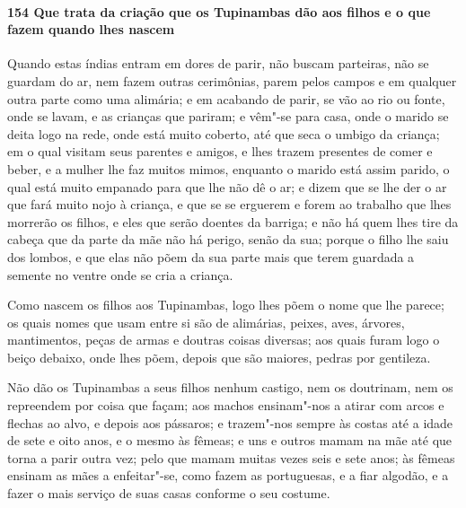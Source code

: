 \begin{linenumbers}
\paragraph{154 Que trata da criação que os Tupinambas dão aos filhos e o que fazem quando
lhes nascem}\quad
Quando estas índias entram em dores de parir, não buscam parteiras, não se guardam do ar,
nem fazem outras cerimônias, parem pelos campos e em qualquer outra parte como uma
alimária; e em acabando de parir, se vão ao rio ou fonte, onde se lavam, e as crianças que
pariram; e vêm"-se para casa, onde o marido se deita logo na rede, onde está muito coberto,
até que seca o umbigo da criança; em o qual visitam seus parentes e amigos, e lhes trazem
presentes de comer e beber, e a mulher lhe faz muitos mimos, enquanto o marido está assim
parido, o qual está muito empanado para que lhe não dê o ar; e dizem que se lhe der o ar
que fará muito nojo à criança, e que se se erguerem e forem ao trabalho que lhes morrerão
os filhos, e eles que serão doentes da barriga; e não há quem lhes tire da cabeça que da
parte da mãe não há perigo, senão da sua; porque o filho lhe saiu dos lombos, e que elas
não põem da sua parte mais que terem guardada a semente no ventre onde se cria a criança.

Como nascem os filhos aos Tupinambas, logo lhes põem o nome que lhe parece; os quais nomes
que usam entre si são de alimárias, peixes, aves, árvores, mantimentos, peças de armas e
doutras coisas diversas; aos quais furam logo o beiço debaixo, onde lhes põem, depois que
são maiores, pedras por gentileza.

Não dão os Tupinambas a seus filhos nenhum castigo, nem os doutrinam, nem os repreendem
por coisa que façam; aos machos ensinam"-nos a atirar com arcos e flechas ao alvo, e depois
aos pássaros; e trazem"-nos sempre às costas até a idade de sete e oito anos, e o mesmo às
fêmeas; e uns e outros mamam na mãe até que torna a parir outra vez; pelo que mamam muitas
vezes seis e sete anos; às fêmeas ensinam as mães a enfeitar"-se, como fazem as
portuguesas, e a fiar algodão, e a fazer o mais serviço de suas casas conforme o seu costume.



\end{linenumbers}
